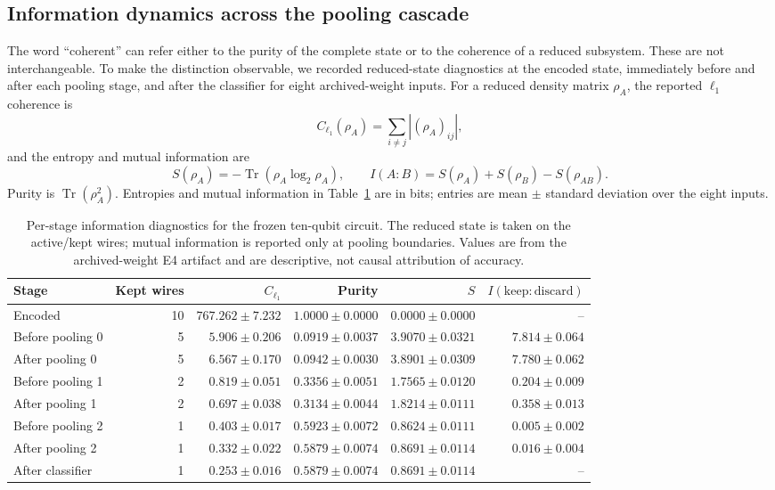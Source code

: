 \documentclass[conference]{IEEEtran}
\begin{document}
\subsection{Information dynamics across the pooling cascade}
The word ``coherent'' can refer either to the purity of the complete state or to
the coherence of a reduced subsystem. These are not interchangeable. To make
the distinction observable, we recorded reduced-state diagnostics at the
encoded state, immediately before and after each pooling stage, and after the
classifier for eight archived-weight inputs. For a reduced density matrix
$\rho_A$, the reported $\ell_1$ coherence is
\begin{equation}
C_{\ell_1}(\rho_A)=\sum_{i\ne j}|(\rho_A)_{ij}|,
\end{equation}
and the entropy and mutual information are
{\scriptsize
\begin{equation}
S(\rho_A)=-\operatorname{Tr}(\rho_A\log_2\rho_A),\qquad
I(A:B)=S(\rho_A)+S(\rho_B)-S(\rho_{AB}).
\end{equation}
}
Purity is $\operatorname{Tr}(\rho_A^2)$. Entropies and mutual information in
Table~\ref{tab:information} are in bits; entries are mean $\pm$ standard
deviation over the eight inputs.

\begin{table}[!t]
\caption{Per-stage information diagnostics for the frozen ten-qubit circuit. The reduced state is taken on the active/kept wires; mutual information is reported only at pooling boundaries. Values are from the archived-weight E4 artifact and are descriptive, not causal attribution of accuracy.}
\label{tab:information}
\centering
\small
\begin{tabular}{@{}lrrrrr@{}}
\toprule
\textbf{Stage} & \textbf{Kept wires} & \textbf{$C_{\ell_1}$} & \textbf{Purity} & \textbf{$S$} & \textbf{$I(\mathrm{keep}:\mathrm{discard})$} \\
\midrule
Encoded & 10 & $767.262\pm7.232$ & $1.0000\pm0.0000$ & $0.0000\pm0.0000$ & -- \\
Before pooling 0 & 5 & $5.906\pm0.206$ & $0.0919\pm0.0037$ & $3.9070\pm0.0321$ & $7.814\pm0.064$ \\
After pooling 0 & 5 & $6.567\pm0.170$ & $0.0942\pm0.0030$ & $3.8901\pm0.0309$ & $7.780\pm0.062$ \\
Before pooling 1 & 2 & $0.819\pm0.051$ & $0.3356\pm0.0051$ & $1.7565\pm0.0120$ & $0.204\pm0.009$ \\
After pooling 1 & 2 & $0.697\pm0.038$ & $0.3134\pm0.0044$ & $1.8214\pm0.0111$ & $0.358\pm0.013$ \\
Before pooling 2 & 1 & $0.403\pm0.017$ & $0.5923\pm0.0072$ & $0.8624\pm0.0111$ & $0.005\pm0.002$ \\
After pooling 2 & 1 & $0.332\pm0.022$ & $0.5879\pm0.0074$ & $0.8691\pm0.0114$ & $0.016\pm0.004$ \\
After classifier & 1 & $0.253\pm0.016$ & $0.5879\pm0.0074$ & $0.8691\pm0.0114$ & -- \\
\bottomrule
\end{tabular}
\end{table}
\end{document}

